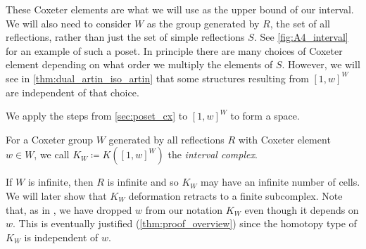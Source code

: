 \documentclass[class=article, crop=false]{standalone}
\begin{document}
These Coxeter elements are what we will use as the upper bound of our interval. We will also need to consider $W$ as the group generated by $R$, the set of all reflections, rather than just the set of simple reflections $S$. See \cref{fig:A4_interval} for an example of such a poset. In principle there are many choices of Coxeter element depending on what order we multiply the elements of $S$. 
However, we will see in \cref{thm:dual_artin_iso_artin} that some structures resulting from $[1,w]^W$ are independent of that choice.

We apply the steps from \cref{sec:poset_cx} to $[1,w]^W$ to form a space.

\begin{definition}
    For a Coxeter group $W$ generated by all reflections $R$ with Coxeter element $w \in W$, we call $K_{W} \coloneq K([1,w]^W)$ the \emph{interval complex}.
    \label{def:interval_complex}
\end{definition}

If $W$ is infinite, then $R$ is infinite and so $K_W$ may have an infinite number of cells. We will later show that $K_W$ deformation retracts to a finite subcomplex. Note that, as in \cite{paolini_salvetti_kpi1_2021}, we have dropped $w$ from our notation $K_{W}$ even though it depends on $w$. This is eventually justified (\cref{thm:proof_overview}) since the homotopy type of $K_W$ is independent of $w$.
\end{document}

